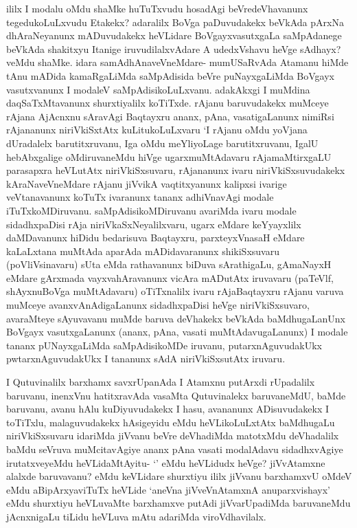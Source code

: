 \begin{artha}
ililx I modalu oMdu shaMke huTuTxvudu hosadAgi beVredeVhavanunx tegedukoLuLxvudu Etakekx? adaralilx BoVga paDuvudakekx beVkAda pArxNa dhAraNeyanunx mADuvudakekx heVLidare BoVgayxvasutxgaLa saMpAdanege beVkAda shakitxyu Itanige iruvudilalxvAdare A udedxVshavu heVge sAdhayx?veMdu shaMke. idara samAdhAnaveVneMdare- mumUSaRvAda Atamanu hiMde tAnu mADida kamaRgaLiMda saMpAdisida beVre puNayxgaLiMda BoVgayx vasutxvanunx I modaleV saMpAdisikoLuLxvanu. adakAkxgi I muMdina daqSaTxMtavanunx shurxtiyalilx koTiTxde. rAjanu baruvudakekx muMceye rAjana AjAcnxnu sAravAgi Baqtayxru ananx, pAna, vasatigaLanunx nimiRsi rAjananunx niriVkiSxtAtx kuLitukoLuLxvaru `I rAjanu oMdu yoVjana dUradalelx barutitxruvanu, Iga oMdu meYliyoLage barutitxruvanu, IgalU hebAbxgalige oMdiruvaneMdu hiVge ugarxmuMtAdavaru rAjamaMtirxgaLU parasapxra heVLutAtx niriVkiSxsuvaru, rAjananunx ivaru niriVkiSxsuvudakekx kAraNaveVneMdare rAjanu jiVvikA vaqtitxyanunx kalipxsi ivarige veVtanavanunx koTuTx ivaranunx tananx adhiVnavAgi modale iTuTxkoMDiruvanu. saMpAdisikoMDiruvanu avariMda ivaru modale sidadhxpaDisi rAja niriVkaSxNeyalilxvaru, ugarx eMdare keYyayxlilx daMDavanunx hiDidu bedarisuva Baqtayxru, parxteyxVnasaH eMdare kaLaLxtana muMtAda aparAda mADidavaranunx shikiSxsuvaru (poVliVsinavaru) sUta eMda rathavanunx biDuva sArathigaLu, gAmaNayxH eMdare gArxmada vayxvahAravanunx vicAra mADutAtx iruvavaru (paTeVlf, shAyxnuBoVga muMtAdavaru) oTiTxnalilx ivaru rAjaBaqtayxru rAjanu varuva muMceye avanxvAnAdigaLanunx sidadhxpaDisi heVge niriVkiSxsuvaro, avaraMteye sAyuvavanu muMde baruva deVhakekx beVkAda baMdhugaLanUnx BoVgayx vasutxgaLanunx (ananx, pAna, vasati muMtAdavugaLanunx) I modale tananx pUNayxgaLiMda saMpAdisikoMDe iruvanu, putarxnAguvudakUkx pwtarxnAguvudakUkx I tananunx sAdA niriVkiSxsutAtx iruvaru. 
\end{artha}%

\begin{artha}
I Qutuvinalilx barxhamx savxrUpanAda I Atamxnu putArxdi rUpadalilx baruvanu, inenxVnu hatitxravAda vasaMta Qutuvinalekx baruvaneMdU, baMde baruvanu, avanu hAlu kuDiyuvudakekx I hasu, avananunx ADisuvudakekx I toTiTxlu, malaguvudakekx hAsigeyidu eMdu heVLikoLuLxtAtx baMdhugaLu niriVkiSxsuvaru idariMda jiVvanu beVre deVhadiMda matotxMdu deVhadalilx baMdu seVruva muMcitavAgiye ananx pAna vasati modalAdavu sidadhxvAgiye irutatxveyeMdu heVLidaMtAyitu- `\stext ' eMdu heVLidudx heVge? jiVvAtamxne alalxde baruvavanu? eMdu keVLidare shurxtiyu ililx jiVvanu barxhamxvU oMdeV eMdu aBipArxyaviTuTx heVLide `aneVna jiVveVnAtamxnA anuparxvishayx' eMdu shurxtiyu heVLuvaMte barxhamxve putAdi jiVvarUpadiMda baruvaneMdu jAcnxnigaLu tiLidu heVLuva mAtu adariMda viroVdhavilalx. 	
\end{artha}%

